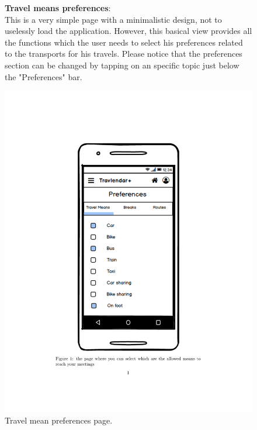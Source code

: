	\begin{figure}
				\begin{flushleft}
				\textbf{Travel means preferences}:\\
			This is a very simple page with a minimalistic design, not to uselessly load the application. However, this basical view provides all the functions which the user needs to select his preferences related to the transports for his travels. 
			Please notice that the preferences section can be changed by tapping on an specific topic just below the "Preferences" bar.
		\end{flushleft}
		\centering
		\includegraphics[width=0.6\linewidth]{mockups/PreferencesTravelMeans}
		\caption{Travel mean preferences page.}
		\label{fig:preferencestravelmeans}
	\end{figure}

